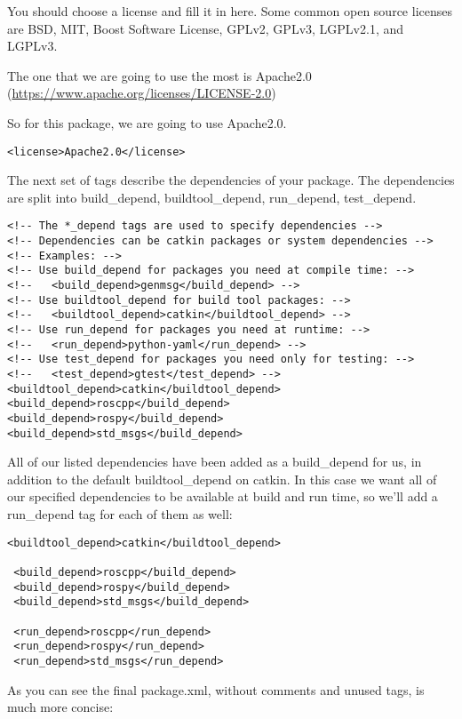 \noindent You should choose a license and fill it in here. Some common open source licenses are BSD, MIT, Boost Software License, GPLv2, GPLv3, LGPLv2.1, and LGPLv3.
\newline

\noindent The one that we are going to use the most is Apache2.0 (\url{https://www.apache.org/licenses/LICENSE-2.0})
\newline

\noindent So for this package, we are going to use Apache2.0.

\begin{lstlisting}[breaklines=true languages=xml]
 <license>Apache2.0</license>
\end{lstlisting}

\newpage

\noindent The next set of tags describe the dependencies of your package. The dependencies are split into build\_depend, buildtool\_depend, run\_depend, test\_depend.

\begin{lstlisting}[breaklines=true languages=xml]
<!-- The *_depend tags are used to specify dependencies -->
<!-- Dependencies can be catkin packages or system dependencies -->
<!-- Examples: -->
<!-- Use build_depend for packages you need at compile time: -->
<!--   <build_depend>genmsg</build_depend> -->
<!-- Use buildtool_depend for build tool packages: -->
<!--   <buildtool_depend>catkin</buildtool_depend> -->
<!-- Use run_depend for packages you need at runtime: -->
<!--   <run_depend>python-yaml</run_depend> -->
<!-- Use test_depend for packages you need only for testing: -->
<!--   <test_depend>gtest</test_depend> -->
<buildtool_depend>catkin</buildtool_depend>
<build_depend>roscpp</build_depend>
<build_depend>rospy</build_depend>
<build_depend>std_msgs</build_depend>
\end{lstlisting}

All of our listed dependencies have been added as a build\_depend for us, in addition to the default buildtool\_depend on catkin. In this case we want all of our specified dependencies to be available at build and run time, so we'll add a run\_depend tag for each of them as well:

\begin{lstlisting}[breaklines=true languages=xml]
 <buildtool_depend>catkin</buildtool_depend>
 
 <build_depend>roscpp</build_depend>
 <build_depend>rospy</build_depend>
 <build_depend>std_msgs</build_depend>
 
 <run_depend>roscpp</run_depend>
 <run_depend>rospy</run_depend>
 <run_depend>std_msgs</run_depend>
\end{lstlisting}
\pagebreak
As you can see the final package.xml, without comments and unused tags, is much more concise:


